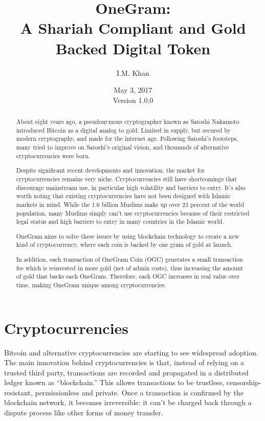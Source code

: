 \documentclass[letterpaper,11pt]{article}
\title{\LARGE OneGram:\\
	\Large A Shariah Compliant and Gold Backed Digital Token}
\author{
		I.M. Khan
	}
\date{May 3, 2017\\\small Version 1.0.0}
\begin{document}
\maketitle

\begin{abstract}

About eight years ago, a pseudonymous cryptographer known as Satoshi Nakamoto introduced Bitcoin as a digital analog to gold: Limited in supply, but secured by modern cryptography, and made for the internet age.
Following Satoshi’s footsteps, many tried to improve on Satoshi’s original vision, and thousands of alternative cryptocurrencies were born.

Despite significant recent developments and innovation, the market for cryptocurrencies remains very niche. Cryptocurrencies still have shortcomings that discourage mainstream use, in particular high volatility and barriers to entry. It’s also worth noting that existing cryptocurrencies have not been designed with Islamic markets in mind. While the 1.6 billion Muslims make up over 23 percent of the world population, many Muslims simply can’t use cryptocurrencies because of their restricted legal status and high barriers to entry in many countries in the Islamic world.

OneGram aims to solve these issues by using blockchain technology to create a new kind of cryptocurrency, where each coin is backed by one gram of gold at launch.

In addition, each transaction of OneGram Coin (OGC) generates a small transaction fee which is reinvested in more gold (net of admin costs), thus increasing the amount of gold that backs each OneGram. Therefore, each OGC increases in real value over time, making OneGram unique among cryptocurrencies.

\end{abstract}

\section{Cryptocurrencies}

Bitcoin and alternative cryptocurrencies are starting to see widespread adoption. The main innovation behind cryptocurrencies is that, instead of relying on a trusted third party, transactions are recorded and propagated in a distributed ledger known as “blockchain.” This allows transactions to be trustless, censorship-resistant, permissionless and private. Once a transaction is confirmed by the blockchain network, it becomes irreversible: it can’t be charged back through a dispute process like other forms of money transfer.
\end{document}
